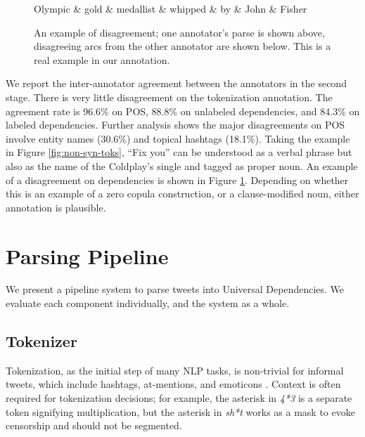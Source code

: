 \documentclass[11pt,a4paper]{article}
\begin{document}
\begin{figure}
\centering
\small
\begin{dependency}[edge slant=2, text only label, label style=above]
	\begin{deptext}
		Olympic \& gold \& medallist \& whipped \& by \& John \& Fisher \\
	\end{deptext}
\end{dependency}
\caption{An example of disagreement; one annotator's parse is shown above, disagreeing arcs from the other
  annotator are shown below. This is a real example in our annotation.}\label{fig:disagree}
\end{figure}

We report the inter-annotator agreement between the annotators
in the second stage. There is very little disagreement on the
tokenization annotation. The agreement rate is 96.6\% on POS, 
88.8\% on unlabeled dependencies, and
84.3\% on labeled dependencies. 
Further analysis shows the major disagreements on POS
involve entity names (30.6\%) and topical hashtags (18.1\%).
Taking the example in Figure \ref{fig:non-syn-toks}, ``Fix you'' 
can
be understood as a verbal phrase but also as the name of the Coldplay's
single and tagged as proper noun. 
An example of a disagreement on
dependencies is shown in Figure \ref{fig:disagree}.  Depending on
whether this is an example of a zero copula construction, or a clause-modified
noun, either annotation is plausible.





\section{Parsing Pipeline}
\label{sec:parsing}

We present a pipeline system to parse tweets into Universal
Dependencies.  We evaluate each component individually, and the system
as a whole.

\subsection{Tokenizer} \label{sec:tok}
Tokenization, as the initial step of many NLP tasks, is non-trivial for
informal tweets, which include hashtags, at-mentions, and emoticons
\cite{ICWSM101540}.  Context is often required for tokenization
decisions; for example,
the asterisk in {\it 4*3} is a separate token signifying
multiplication, but the asterisk in {\it sh*t}
works as a mask to evoke censorship and should not be segmented.
\end{document}
